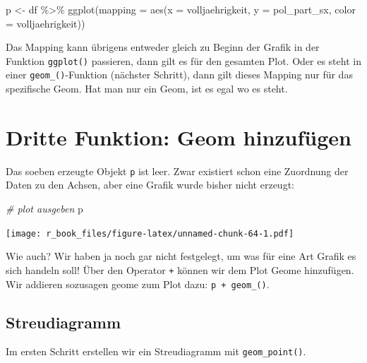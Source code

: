 \documentclass[
]{book}
\newenvironment{Shaded}{\begin{snugshade}}{\end{snugshade}}
\newcommand{\AttributeTok}[1]{\textcolor[rgb]{0.77,0.63,0.00}{#1}}
\newcommand{\CommentTok}[1]{\textcolor[rgb]{0.56,0.35,0.01}{\textit{#1}}}
\newcommand{\FunctionTok}[1]{\textcolor[rgb]{0.00,0.00,0.00}{#1}}
\newcommand{\NormalTok}[1]{#1}
\newcommand{\OtherTok}[1]{\textcolor[rgb]{0.56,0.35,0.01}{#1}}
\newcommand{\SpecialCharTok}[1]{\textcolor[rgb]{0.00,0.00,0.00}{#1}}
\begin{document}
\begin{Shaded}
\begin{Highlighting}[]
\NormalTok{p }\OtherTok{\textless{}{-}}\NormalTok{ df }\SpecialCharTok{\%\textgreater{}\%} 
  \FunctionTok{ggplot}\NormalTok{(}\AttributeTok{mapping =} \FunctionTok{aes}\NormalTok{(}\AttributeTok{x =}\NormalTok{ volljaehrigkeit,}
                       \AttributeTok{y =}\NormalTok{ pol\_part\_sx, }
                       \AttributeTok{color =}\NormalTok{ volljaehrigkeit))}
\end{Highlighting}
\end{Shaded}

Das Mapping kann übrigens entweder gleich zu Beginn der Grafik in der Funktion \texttt{ggplot()} passieren, dann gilt es für den gesamten Plot. Oder es steht in einer \texttt{geom\_()}-Funktion (nächster Schritt), dann gilt dieses Mapping nur für das spezifische Geom. Hat man nur ein Geom, ist es egal wo es steht.

\hypertarget{dritte-funktion-geom-hinzufuxfcgen}{%
\section{Dritte Funktion: Geom hinzufügen}\label{dritte-funktion-geom-hinzufuxfcgen}}

Das soeben erzeugte Objekt \texttt{p} ist leer. Zwar existiert schon eine Zuordnung der Daten zu den Achsen, aber eine Grafik wurde bisher nicht erzeugt:

\begin{Shaded}
\begin{Highlighting}[]
\CommentTok{\# plot ausgeben}
\NormalTok{p }
\end{Highlighting}
\end{Shaded}

\texttt{[image: r\_book\_files/figure-latex/unnamed-chunk-64-1.pdf]}

Wie auch? Wir haben ja noch gar nicht festgelegt, um was für eine Art Grafik es sich handeln soll! Über den Operator \texttt{+} können wir dem Plot Geome hinzufügen. Wir addieren sozusagen geome zum Plot dazu: \texttt{p\ +\ geom\_()}.

\hypertarget{streudiagramm-1}{%
\subsection{Streudiagramm}\label{streudiagramm-1}}

Im ersten Schritt erstellen wir ein Streudiagramm mit \texttt{geom\_point()}.
\end{document}
